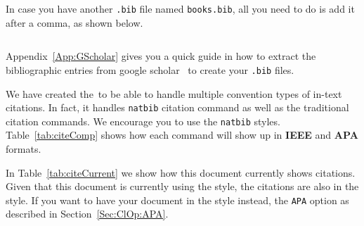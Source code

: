 \documentclass[12pt]{uomthesis}
\begin{document}
In case you have another \texttt{.bib} file named \texttt{books.bib}, all you need to do is add it after a comma, as shown below.

\begin{indentedQuote}
\begin{verbatim}

\end{verbatim}
\end{indentedQuote}

Appendix~\ref{App:GScholar} gives you a quick guide in how to extract the bibliographic entries from google scholar~ to create your \texttt{.bib} files. 

We have created the~\TheClass to be able to handle multiple convention types of in-text citations. In fact, it handles \texttt{natbib} citation command as well as the traditional citation commands. We encourage you to use the \texttt{natbib} styles. Table~\ref{tab:citeComp} shows how each command will show up in \textbf{IEEE} and \textbf{APA} formats.

\begin{table}[!htb]
\end{table}

In Table~\ref{tab:citeCurrent} we show how this document currently shows citations. Given that this document is currently using the  style, the citations are also in the  style. If you want to have your document in the  style instead,  the \texttt{APA} option as described in Section~\ref{Sec:ClOp:APA}.
\end{document}
